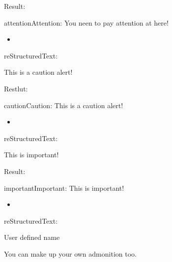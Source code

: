 \documentclass[letterpaper,12pt,english]{sphinxmanual}
\begin{document}
Result:

\begin{sphinxadmonition}{attention}{Attention:}
You neen to pay attention at here!
\end{sphinxadmonition}
\begin{itemize}
\item {} 

\end{itemize}

reStructuredText:

\begin{sphinxVerbatim}[commandchars=\\\{\}]
 

   This is a caution alert!
\end{sphinxVerbatim}

Restlut:

\begin{sphinxadmonition}{caution}{Caution:}
This is a caution alert!
\end{sphinxadmonition}
\begin{itemize}
\item {} 

\end{itemize}

reStructuredText:

\begin{sphinxVerbatim}[commandchars=\\\{\}]
 

        This is important!
\end{sphinxVerbatim}

Result:

\begin{sphinxadmonition}{important}{Important:}
This is important!
\end{sphinxadmonition}
\begin{itemize}
\item {} 

\end{itemize}

reStructuredText:

\begin{sphinxVerbatim}[commandchars=\\\{\}]
  User defined name

   You can make up your own admonition too.
\end{sphinxVerbatim}
\end{document}
